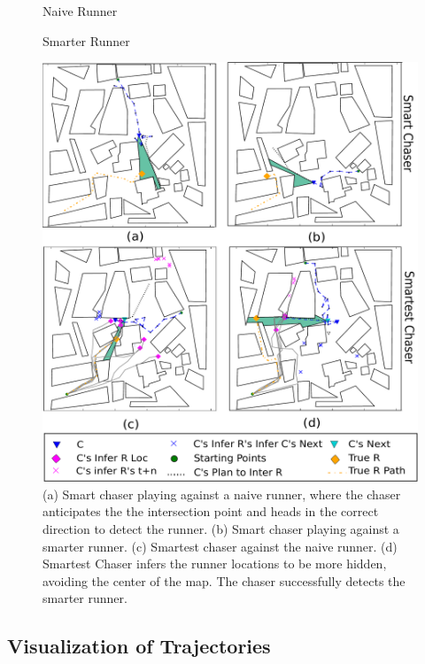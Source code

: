 \documentclass{article}
\begin{document}
\begin{figure}[!t]
\begin{center}
\begin{minipage}[t]{0.4\linewidth}
\centerline{\textsf{\footnotesize Naive Runner}}
\end{minipage}
\begin{minipage}[t]{0.4\linewidth}
\centerline{\textsf{\footnotesize Smarter Runner}}
\end{minipage}

\centerline{\includegraphics[width=0.9\columnwidth]{detection_examples.pdf}}
\caption{(a) Smart chaser playing against a naive runner, where the chaser anticipates the the intersection point and heads in the correct direction to detect the runner. (b) Smart chaser playing against a smarter runner. (c) Smartest chaser against the naive runner. (d) Smartest Chaser infers the runner locations to be more hidden, avoiding the center of the map. The chaser successfully detects the smarter runner.} %
\label{fig:exps}
\end{center}
\vspace{-1em}
\end{figure} 

\vspace{-0.25em}
\subsection{Visualization of Trajectories}
\vspace{-0.25em}
\end{document}
